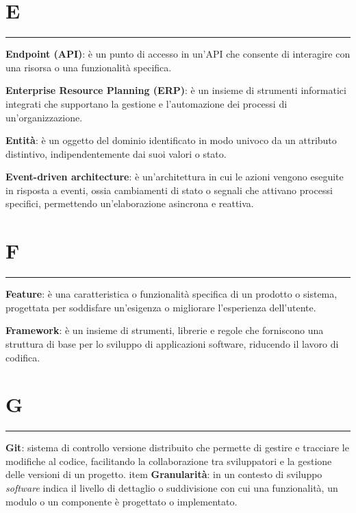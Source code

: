\section*{E}
{\color{lightgray}\rule{\textwidth}{0.4pt}} %
\begin{glossaryitemize}
    \item \textbf{Endpoint (API)}:  è un punto di accesso in un'API che consente di interagire con una risorsa o una funzionalità specifica.
    \item \textbf{Enterprise Resource Planning (ERP)}: è un insieme di strumenti informatici integrati che supportano la gestione e l'automazione dei processi di un'organizzazione. 
    \item \textbf{Entità}: è un oggetto del dominio identificato in modo univoco da un attributo distintivo, indipendentemente dai suoi valori o stato.
    \item \textbf{Event-driven architecture}: è un'architettura in cui le azioni vengono eseguite in risposta a eventi, ossia cambiamenti di stato o segnali che attivano processi specifici, permettendo un'elaborazione asincrona e reattiva.
\end{glossaryitemize}

\section*{F}
{\color{lightgray}\rule{\textwidth}{0.4pt}} %
\begin{glossaryitemize}
    \item \textbf{Feature}: è una caratteristica o funzionalità specifica di un prodotto o sistema, progettata per soddisfare un'esigenza o migliorare l'esperienza dell'utente.
    \item \textbf{Framework}: è un insieme di strumenti, librerie e regole che forniscono una struttura di base per lo sviluppo di applicazioni software, riducendo il lavoro di codifica.
\end{glossaryitemize}

\section*{G}
{\color{lightgray}\rule{\textwidth}{0.4pt}} %
\begin{glossaryitemize}
    \item \textbf{Git}: sistema di controllo versione distribuito che permette di gestire e tracciare le modifiche al codice, facilitando la collaborazione tra sviluppatori e la gestione delle versioni di un progetto.
    item \textbf{Granularità}: in un contesto di sviluppo \textit{software} indica il livello di dettaglio o suddivisione con cui una funzionalità, un modulo o un componente è progettato o implementato.
\end{glossaryitemize}

